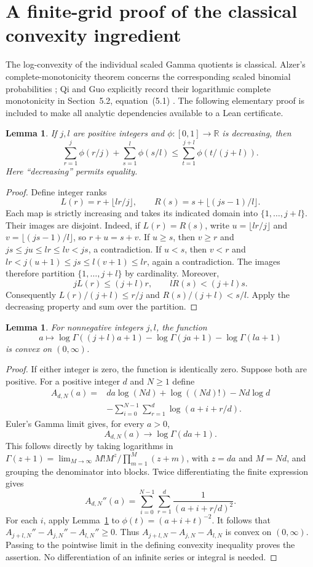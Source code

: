 \documentclass[11pt]{article}
\newtheorem{lemma}[theorem]{Lemma}
\newcommand{\R}{\mathbb R}
\begin{document}
\section{A finite-grid proof of the classical convexity ingredient}
The log-convexity of the individual scaled Gamma quotients is classical.
Alzer's complete-monotonicity theorem concerns the corresponding scaled
binomial probabilities \cite{Alzer}; Qi and Guo explicitly record their
logarithmic complete monotonicity in Section~5.2, equation~(5.1)
\cite{QG}. The following elementary proof is included to make all analytic
dependencies available to a Lean certificate.

\begin{lemma}\label{lem:grid}
If $j,l$ are positive integers and $\phi:[0,1]\to\R$ is decreasing, then
\[
 \sum_{r=1}^j\phi(r/j)+\sum_{s=1}^l\phi(s/l)
 \leq\sum_{t=1}^{j+l}\phi(t/(j+l)).
\]
Here ``decreasing'' permits equality.
\end{lemma}
\begin{proof}
Define integer ranks
\[
 L(r)=r+\lfloor lr/j\rfloor,\qquad
 R(s)=s+\lfloor(js-1)/l\rfloor.
\]
Each map is strictly increasing and takes its indicated domain into
$\{1,\ldots,j+l\}$. Their images are disjoint. Indeed, if
$L(r)=R(s)$, write $u=\lfloor lr/j\rfloor$ and
$v=\lfloor(js-1)/l\rfloor$, so $r+u=s+v$.
If $u\geq s$, then $v\geq r$ and
$js\leq ju\leq lr\leq lv<js$, a contradiction.
If $u<s$, then $v<r$ and
$lr<j(u+1)\leq js\leq l(v+1)\leq lr$, again a contradiction.
The images therefore partition $\{1,\ldots,j+l\}$ by cardinality.
Moreover,
\[
 jL(r)\leq(j+l)r,\qquad lR(s)<(j+l)s.
\]
Consequently $L(r)/(j+l)\leq r/j$ and $R(s)/(j+l)<s/l$.
Apply the decreasing property and sum over the partition.
\end{proof}

\begin{lemma}\label{lem:gamma}
For nonnegative integers $j,l$, the function
\[
 a\longmapsto
 \log\Gamma((j+l)a+1)-\log\Gamma(ja+1)-\log\Gamma(la+1)
\]
is convex on $(0,\infty)$.
\end{lemma}
\begin{proof}
If either integer is zero, the function is identically zero. Suppose both
are positive. For a positive integer $d$ and $N\geq1$ define
\begin{align*}
 A_{d,N}(a)={}&da\log(Nd)+\log((Nd)!)-Nd\log d\\
 &-\sum_{i=0}^{N-1}\sum_{r=1}^d\log(a+i+r/d).
\end{align*}
Euler's Gamma limit gives, for every $a>0$,
\[
 A_{d,N}(a)\longrightarrow\log\Gamma(da+1).
\]
This follows directly by taking logarithms in
$\Gamma(z+1)=\lim_{M\to\infty}M!M^z/\prod_{m=1}^M(z+m)$,
with $z=da$ and $M=Nd$, and grouping the denominator into blocks.
Twice differentiating the finite expression gives
\[
 A_{d,N}''(a)=\sum_{i=0}^{N-1}\sum_{r=1}^d
                   \frac{1}{(a+i+r/d)^2}.
\]
For each $i$, apply Lemma~\ref{lem:grid} to
$\phi(t)=(a+i+t)^{-2}$. It follows that
$A_{j+l,N}''-A_{j,N}''-A_{l,N}''\geq0$.
Thus $A_{j+l,N}-A_{j,N}-A_{l,N}$ is convex on $(0,\infty)$.
Passing to the pointwise limit in the defining convexity inequality proves
the assertion. No differentiation of an infinite series or integral is
needed.
\end{proof}
\end{document}

